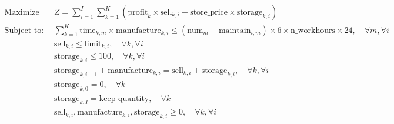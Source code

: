 \documentclass{article}
\begin{document}
\begin{align*}
\text{Maximize} \quad & Z = \sum_{i=1}^{I} \sum_{k=1}^{K} \left( \text{profit}_k \times \text{sell}_{k,i} - \text{store\_price} \times \text{storage}_{k,i} \right) \\
\text{Subject to:} \quad & \sum_{k=1}^{K} \text{time}_{k,m} \times \text{manufacture}_{k,i} \leq (\text{num}_{m} - \text{maintain}_{i,m}) \times 6 \times \text{n\_workhours} \times 24, \quad \forall m, \forall i \\
& \text{sell}_{k,i} \leq \text{limit}_{k,i}, \quad \forall k, \forall i \\
& \text{storage}_{k,i} \leq 100, \quad \forall k, \forall i \\
& \text{storage}_{k,i-1} + \text{manufacture}_{k,i} = \text{sell}_{k,i} + \text{storage}_{k,i}, \quad \forall k, \forall i \\
& \text{storage}_{k,0} = 0, \quad \forall k \\
& \text{storage}_{k,I} = \text{keep\_quantity}, \quad \forall k \\
& \text{sell}_{k,i}, \text{manufacture}_{k,i}, \text{storage}_{k,i} \geq 0, \quad \forall k, \forall i 
\end{align*}
\end{document}
